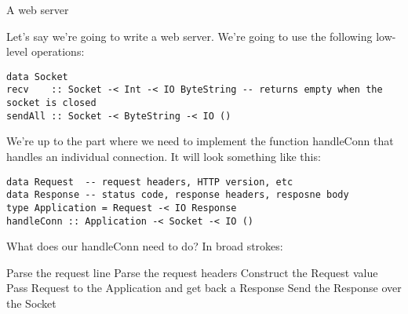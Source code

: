 A web server

Let's say we're going to write a web server. We're going to use the following low-level
operations:
\begin{lstlisting}
data Socket
recv    :: Socket -< Int -< IO ByteString -- returns empty when the socket is closed
sendAll :: Socket -< ByteString -< IO ()
\end{lstlisting}
We're up to the part where we need to implement the function handleConn that
handles an individual connection. It will look something like this:
\begin{lstlisting}
data Request  -- request headers, HTTP version, etc
data Response -- status code, response headers, resposne body
type Application = Request -< IO Response
handleConn :: Application -< Socket -< IO ()
\end{lstlisting}
What does our handleConn need to do? In broad strokes:

  
   Parse the request line
   Parse the request headers
   Construct the Request value
   Pass Request to the Application and get back a Response
   Send the Response over the Socket
  

